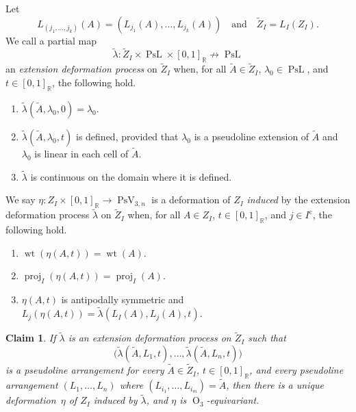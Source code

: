 \documentclass[JEP,XML,SOM,Unicode,NoFloatCountersInSection,published]{cedram}
\newtheorem{claim}[theorem]{Claim}
\theoremstyle{remark}
\let\mb\mathbb
\let\df\emph
\newcommand{\compl}[1]{{{#1}^{\text{c}}}}
\DeclareMathOperator{\wei}{wt}
\DeclareMathOperator{\orth}{O}
\DeclareMathOperator{\pstief}{PsV}
\DeclareMathOperator{\proj}{proj}
\DeclareMathOperator{\curves}{PsL}
\begin{document}
Let
\[
L_{(j_1,\dots,j_k)}(A) = (L_{j_1}(A),\dots,L_{j_k}(A))
\quad \text{and} \quad
\tilde Z_I = L_I(Z_I).
\]
We call a partial map
\[ \tilde \lambda : \tilde Z_I \times \curves \times [0,1]_\mb{R} \not\to \curves \]
an \df{extension deformation process} on $\tilde Z_I$ when, for all $\tilde A \in \tilde Z_I$, $\lambda_0 \in \curves$, and $t \in [0,1]_\mb{R}$, the following hold.
\begin{enumerate}
\item
$\tilde \lambda(\tilde A, \lambda_0, 0) = \lambda_0$.
\item
$\tilde \lambda(\tilde A, \lambda_0, t)$ is defined,
provided that $\lambda_0$ is a pseudoline extension of $\tilde A$ and $\lambda_0$ is linear in each cell of $\tilde A$.
\item
$\tilde \lambda$ is continuous on the domain where it is defined.
\end{enumerate}
We say $\eta: Z_I \times [0,1]_\mb{R} \to \pstief_{3,n}$ is a deformation of $Z_I$ \df{induced} by the extension deformation process $\tilde \lambda$ on $\tilde Z_I$ when, for all $A \in Z_I$, $t \in [0,1]_\mb{R}$, and $j \in \compl{I}$, the following hold.
\begin{enumerate}
\item
$\wei(\eta(A,t)) = \wei(A)$.
\item
$\proj_{I}(\eta(A,t)) = \proj_{I}(A)$.
\item
$\eta(A,t)$ is antipodally symmetric and $L_{j}(\eta(A,t)) = \tilde \lambda(L_I(A),L_j(A),t)$.
\end{enumerate}

\begin{claim}\label{claim-pseudoline-lift}
{If} $\tilde \lambda$ is an extension deformation process on $\tilde Z_I$ such that
\[ \bigl(\tilde \lambda(\tilde A, L_1, t),\dots,\tilde \lambda(\tilde A, L_{n}, t) \bigr) \]
is a pseudoline arrangement for every $\tilde A \in \tilde Z_I$, $t \in [0,1]_\mb{R}$, and every pseudoline arrangement $(L_1,\dots,L_n)$ where $(L_{i_1},\dots,L_{i_m}) = \tilde A$,
{then} there is a unique deformation~$\eta$ of $Z_I$ induced by $\tilde \lambda$, and $\eta$ is $\orth_3$-equivariant.
\end{claim}
\end{document}
